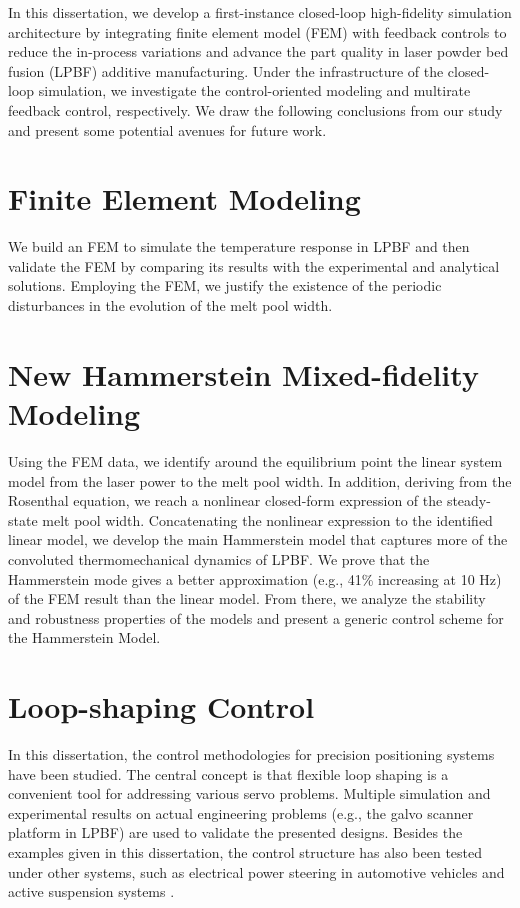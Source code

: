 \documentclass [11pt, proquest] {uwthesis}[2020/02/24]
\begin{document}
In this dissertation, we develop a first-instance closed-loop high-fidelity
simulation architecture by integrating finite element model (FEM)
with feedback controls to reduce the in-process variations and advance
the part quality in laser powder bed fusion (LPBF) additive manufacturing. Under the infrastructure of the closed-loop simulation, we investigate the control-oriented modeling and multirate feedback control, respectively. We draw the following conclusions from our study and present some potential avenues for future work.

\section*{Finite Element Modeling}

We build an FEM to simulate the temperature response in LPBF and then
validate the FEM by comparing its results with the experimental and
analytical solutions. Employing the FEM, we justify the existence
of the periodic disturbances in the evolution of the melt pool width.

\section*{New Hammerstein Mixed-fidelity Modeling}

Using the FEM data, we identify around the equilibrium point the linear
system model from the laser power to the melt pool width. In addition,
deriving from the Rosenthal equation, we reach a nonlinear closed-form
expression of the steady-state melt pool width. Concatenating the
nonlinear expression to the identified linear model, we develop the
main Hammerstein model that captures more of the convoluted thermomechanical
dynamics of LPBF. We prove that the Hammerstein mode gives a better
approximation (e.g., 41\% increasing at 10 Hz) of the FEM result than
the linear model. From there, we analyze the stability and robustness
properties of the models and present a generic control scheme for
the Hammerstein Model.

\section*{Loop-shaping Control}

In this dissertation, the control methodologies for precision
positioning systems have been studied. The central concept is that
flexible loop shaping is a convenient tool for addressing various
servo problems. Multiple simulation and experimental results on actual
engineering problems (e.g., the galvo scanner platform in LPBF) are used to validate the presented designs. Besides
the examples given in this dissertation, the control structure has also
been tested under other systems, such as electrical power steering
in automotive vehicles \cite{chen2013inverse} and active suspension
systems \cite{chen2013selective,landau2005adaptive}. 
\end{document}
